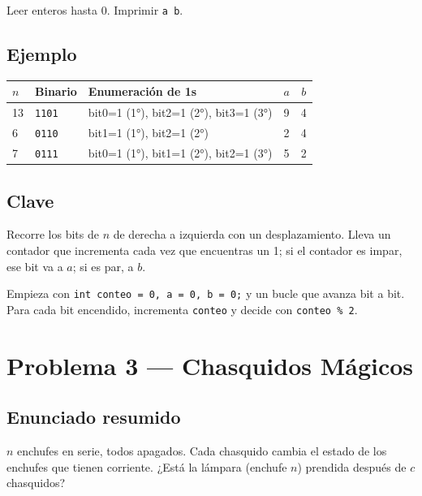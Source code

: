 \documentclass[12pt, oneside]{article}
\begin{document}
Leer enteros hasta 0.  Imprimir \texttt{a b}.

\subsection{Ejemplo}

\begin{center}
\begin{tabular}{p{0.6cm}p{1.4cm}p{5.5cm}cc}
  \toprule
  $n$ & Binario & Enumeración de 1s & $a$ & $b$ \\
  \midrule
  13 & \texttt{1101} & bit0=1 (1°), bit2=1 (2°), bit3=1 (3°) & 9 & 4 \\
   6 & \texttt{0110} & bit1=1 (1°), bit2=1 (2°)              & 2 & 4 \\
   7 & \texttt{0111} & bit0=1 (1°), bit1=1 (2°), bit2=1 (3°) & 5 & 2 \\
  \bottomrule
\end{tabular}
\end{center}

\subsection{Clave}

Recorre los bits de $n$ de derecha a izquierda con un desplazamiento.  Lleva un
contador que incrementa cada vez que encuentras un 1; si el contador es impar,
ese bit va a $a$; si es par, a $b$.

\begin{consejo}
  Empieza con \texttt{int conteo = 0, a = 0, b = 0;} y un bucle que avanza
  bit a bit.  Para cada bit encendido, incrementa \texttt{conteo} y decide con
  \texttt{conteo \% 2}.
\end{consejo}

\newpage

\section{Problema 3 — Chasquidos Mágicos}

\subsection{Enunciado resumido}

$n$ enchufes en serie, todos apagados.  Cada chasquido cambia el estado de los
enchufes que tienen corriente.  ¿Está la lámpara (enchufe $n$) prendida después
de $c$ chasquidos?
\end{document}
